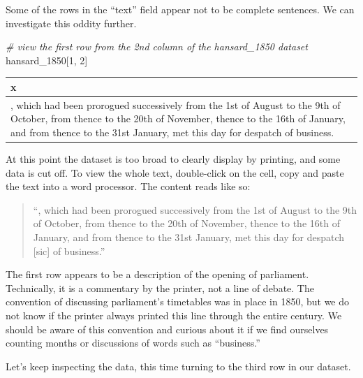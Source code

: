 \documentclass[
]{article}
\newenvironment{Shaded}{\begin{snugshade}}{\end{snugshade}}
\newcommand{\CommentTok}[1]{\textcolor[rgb]{0.56,0.35,0.01}{\textit{#1}}}
\newcommand{\DecValTok}[1]{\textcolor[rgb]{0.00,0.00,0.81}{#1}}
\newcommand{\NormalTok}[1]{#1}
\begin{document}
Some of the rows in the ``text'' field appear not to be complete
sentences. We can investigate this oddity further.

\begin{Shaded}
\begin{Highlighting}[]
\CommentTok{\# view the first row from the 2nd column of the hansard\_1850 dataset}
\NormalTok{hansard\_1850[}\DecValTok{1}\NormalTok{, }\DecValTok{2}\NormalTok{]}
\end{Highlighting}
\end{Shaded}

\begin{longtable}[]{@{}
  >{\raggedright\arraybackslash}p{}@{}}
\toprule\noalign{}
\begin{minipage}[b]{\linewidth}\raggedright
x
\end{minipage} \\
\midrule\noalign{}
\endhead
\bottomrule\noalign{}
\endlastfoot
, which had been prorogued successively from the 1st of August to the
9th of October, from thence to the 20th of November, thence to the 16th
of January, and from thence to the 31st January, met this day for
despatch of business. \\
\end{longtable}

At this point the dataset is too broad to clearly display by printing,
and some data is cut off. To view the whole text, double-click on the
cell, copy and paste the text into a word processor. The content reads
like so:

\begin{quote}
``, which had been prorogued successively from the 1st of August to the
9th of October, from thence to the 20th of November, thence to the 16th
of January, and from thence to the 31st January, met this day for
despatch {[}sic{]} of business.''
\end{quote}

The first row appears to be a description of the opening of parliament.
Technically, it is a commentary by the printer, not a line of debate.
The convention of discussing parliament's timetables was in place in
1850, but we do not know if the printer always printed this line through
the entire century. We should be aware of this convention and curious
about it if we find ourselves counting months or discussions of words
such as ``business.''

Let's keep inspecting the data, this time turning to the third row in
our dataset.
\end{document}
